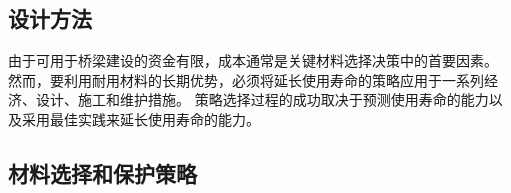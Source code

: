 \subsection{设计方法}
由于可用于桥梁建设的资金有限，成本通常是关键材料选择决策中的首要因素。 然而，要利用耐用材料的长期优势，必须将延长使用寿命的策略应用于一系列经济、设计、施工和维护措施。 策略选择过程的成功取决于预测使用寿命的能力以及采用最佳实践来延长使用寿命的能力。

\subsection{材料选择和保护策略}

